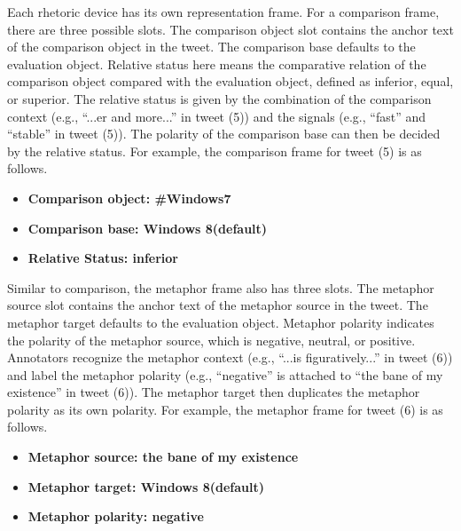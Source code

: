 \documentclass[english]{jnlp_1.4}
\begin{document}
Each rhetoric device has its own representation frame. For a comparison frame, there are three possible slots. The comparison object slot contains the anchor text of the comparison object in the tweet. The comparison base defaults to the evaluation object. Relative status here means the comparative relation of the comparison object compared with the evaluation object, defined as inferior, equal, or superior. The relative status is given by the combination of the comparison context (e.g., ``...er and more...'' in tweet (5)) and the signals (e.g., ``fast'' and ``stable'' in tweet (5)). The polarity of the comparison base can then be decided by the relative status. For example, the comparison frame for tweet (5) is as follows.

\vspace{0.5\Cvs}
\begin{itemize}
\item[] {\bf Comparison object: \#Windows7}
\item[] {\bf Comparison base: Windows 8(default)}
\item[] {\bf Relative Status: inferior}
\end{itemize}
\vspace{0.5\Cvs}

Similar to comparison, the metaphor frame also has three slots. The metaphor source slot contains the anchor text of the metaphor source in the tweet. The metaphor target defaults to the evaluation object. Metaphor polarity indicates the polarity of the metaphor source, which is negative, neutral, or positive. Annotators recognize the metaphor context (e.g., ``...is figuratively...'' in tweet (6)) and label the metaphor polarity (e.g., ``negative'' is attached to ``the bane of my existence'' in tweet (6)). The metaphor target then duplicates the metaphor polarity as its own polarity. For example, the metaphor frame for tweet (6) is as follows.

\vspace{0.5\Cvs}
\begin{itemize}
\item[] {\bf Metaphor source: the bane of my existence}
\item[] {\bf Metaphor target: Windows 8(default)}
\item[] {\bf Metaphor polarity: negative}
\end{itemize}
\vspace{0.5\Cvs}
\end{document}

